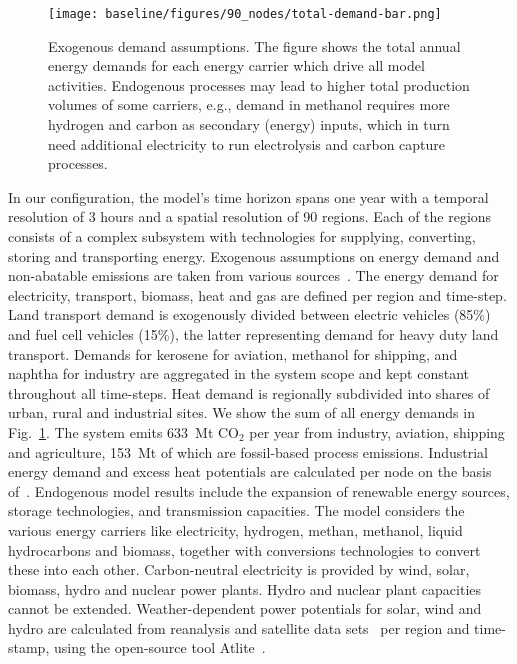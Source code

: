 \documentclass[twocolumn]{article}
\newcommand{\carbon}{CO$_2$}
\begin{document}
\begin{figure}
    \texttt{[image: baseline/figures/90\_nodes/total-demand-bar.png]}
    \caption{Exogenous demand assumptions. The figure shows the total annual energy demands for each energy carrier which drive all model activities. Endogenous processes may lead to higher total production volumes of some carriers, e.g., demand in methanol requires more hydrogen and carbon as secondary (energy) inputs, which in turn need additional electricity to run electrolysis and carbon capture processes.}
    \label{fig:total-demand-bar}
\end{figure}
%
In our configuration, the model's time horizon spans one year with a temporal resolution of 3 hours and a spatial resolution of 90 regions. Each of the regions consists of a complex subsystem with technologies for supplying, converting, storing and transporting energy. Exogenous assumptions on energy demand and non-abatable emissions are taken from various sources~\cite{piamanzGeoreferencedIndustrialSites2018,muehlenpfordtTimeSeries2019,mantzosJRCIDEES20152018,NationalEmissionsReported2023,EurostatCompleteEnergyBalance,uwekrienDemandlib2023}. The energy demand for electricity, transport, biomass, heat and gas are defined per region and time-step. Land transport demand is exogenously divided between electric vehicles (85\%) and fuel cell vehicles (15\%), the latter representing demand for heavy duty land transport. Demands for kerosene for aviation, methanol for shipping, and naphtha for industry are aggregated in the system scope and kept constant throughout all time-steps. Heat demand is regionally subdivided into shares of urban, rural and industrial sites. We show the sum of all energy demands in Fig.~\ref{fig:total-demand-bar}. The system emits 633~Mt \carbon{} per year from industry, aviation, shipping and agriculture, 153~Mt of which are fossil-based process emissions. Industrial energy demand and excess heat potentials are calculated per node on the basis of~\cite{hotmaps_industrial_db}.
%
Endogenous model results include the expansion of renewable energy sources, storage technologies, and transmission capacities.
The model considers the various energy carriers like electricity, hydrogen, methan, methanol, liquid hydrocarbons and biomass, together with conversions technologies to convert these into each other.
Carbon-neutral electricity is provided by wind, solar, biomass, hydro and nuclear power plants. Hydro and nuclear plant capacities cannot be extended. Weather-dependent power potentials for solar, wind and hydro are calculated from reanalysis and satellite data sets~\cite{hersbachERA5GlobalReanalysis2020,pfeifrothSurfaceRadiationData2017}  per region and time-stamp, using the open-source tool Atlite~\cite{hofmannAtliteLightweightPython2021}.
\end{document}
